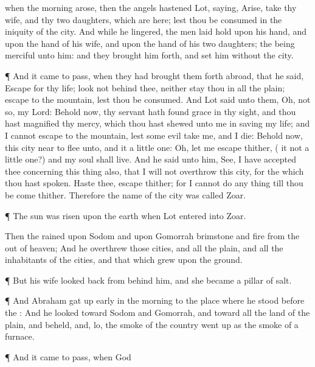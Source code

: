 {when the
morning
arose, then the
angels
hastened
Lot,
saying,
Arise,
take thy
wife, and thy
two
daughters, which are
here; lest thou be
consumed in the
iniquity of the
city.
And while he
lingered, the
men laid
hold upon his
hand, and upon the
hand of his
wife, and upon the
hand of his
two
daughters; the
{} being
merciful unto him: and they brought him
forth, and set
him
without the
city.
\par }{\PP {}¶ And it came to pass, when they had brought them
forth
abroad, that he
said,
Escape
for thy
life;
look not behind
thee, neither
stay thou in all the
plain;
escape to the
mountain, lest thou be
consumed.
And
Lot
said unto them, Oh, not so, my
Lord:
Behold now, thy
servant hath
found
grace in thy
sight, and thou hast
magnified thy
mercy, which thou hast
shewed unto
me in
saving my
life; and I
cannot
escape to the
mountain, lest some
evil
take me, and I
die:
Behold now, this
city
{}
near to
flee unto, and
it
{} a little
one: Oh, let me
escape thither, ({} it not a little
one?) and my
soul shall
live.
And he
said unto him,
See, I have
accepted
thee concerning this
thing also, that I will not
overthrow this
city, for the
which thou hast
spoken.
Haste thee,
escape thither; for I
cannot
do any
thing till thou be
come thither. Therefore the
name of the
city was
called
Zoar.
\par }{\PP {}¶ The
sun was
risen upon the
earth when
Lot
entered into
Zoar.
\par }{\PP {}Then the
{}
rained upon
Sodom and upon
Gomorrah
brimstone and
fire from the
{} out of
heaven;
And he
overthrew
those
cities, and all the
plain, and all the
inhabitants of the
cities, and that which
grew upon the
ground.
\par }{\PP {}¶ But his
wife looked
back from behind
him, and she became a
pillar of
salt.
\par }{\PP {}¶ And
Abraham gat up
early in the
morning to the
place where he
stood
before the
{}:
And he
looked
toward
Sodom and
Gomorrah, and
toward all the
land of the
plain, and
beheld, and, lo, the
smoke of the
country went
up as the
smoke of a
furnace.
\par }{\PP {}¶ And it came to pass, when
God
}
